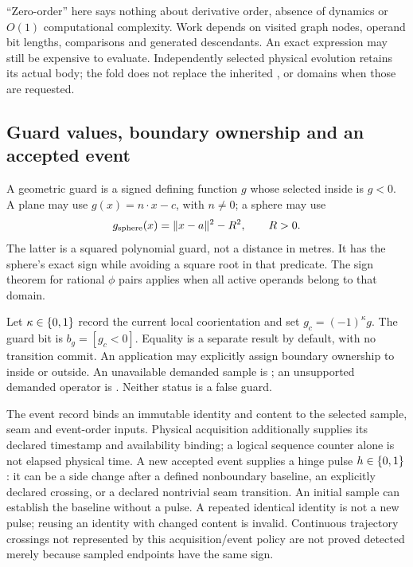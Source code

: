 ``Zero-order'' here says nothing about derivative order, absence of dynamics
or $O(1)$ computational complexity. Work depends on visited graph nodes,
operand bit lengths, comparisons and generated descendants. An exact
expression may still be expensive to evaluate. Independently selected physical
evolution retains its actual body; the fold does not replace the inherited
,  or  domains when those are requested.

\subsection{Guard values, boundary ownership and an accepted event}
A geometric guard is a signed defining function $g$ whose selected inside is
$g<0$. A plane may use $g(x)=n\cdot x-c$, with $n\ne0$; a sphere may use
\begin{equation}
 g_{\rm sphere}(x)=\|x-a\|^2-R^2,\qquad R>0.
 \label{eq:r15-sphere-guard}
\end{equation}
The latter is a squared polynomial guard, not a distance in metres.
It has the sphere's exact sign while avoiding a square root in that predicate.
The sign theorem for rational $\phi$ pairs applies when all active operands
belong to that domain.

Let $\kappa\in\{0,1\}$ record the current local coorientation and set
$g_c=(-1)^\kappa g$. The guard bit is $b_g=[g_c<0]$. Equality is a separate
 result by default, with no transition commit. An application
may explicitly assign boundary ownership to inside or outside. An unavailable
demanded sample is ; an unsupported demanded operator is
. Neither status is a false guard.

The event record binds an immutable identity and content to the selected
sample, seam and event-order inputs. Physical acquisition additionally
supplies its declared timestamp and availability binding; a logical sequence
counter alone is not elapsed physical time. A new accepted event supplies a hinge pulse $h\in\{0,1\}$:
it can be a side change after a defined nonboundary baseline, an explicitly
declared crossing, or a declared nontrivial seam transition. An initial sample
can establish the baseline without a pulse. A repeated identical identity is
not a new pulse; reusing an identity with changed content is invalid. Continuous
trajectory crossings not represented by this acquisition/event policy are not
proved detected merely because sampled endpoints have the same sign.

